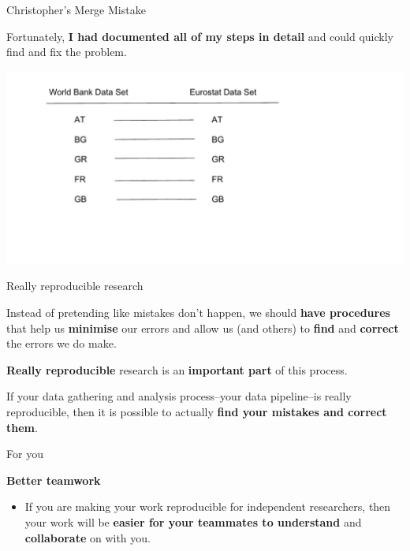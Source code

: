 \documentclass[10pt]{beamer}
\begin{document}
\begin{frame}{Christopher's Merge Mistake}

    Fortunately, \textbf{I had documented all of my steps in detail} and could quickly find and fix the problem.

    \begin{center}
        \includegraphics[scale=0.6]{img/wb_eurostat_match_fix.pdf}
    \end{center}

\end{frame}

\begin{frame}{Really reproducible research}

    Instead of pretending like mistakes don't happen, we should \textbf{have procedures} that help us \textbf{minimise} our errors and allow us (and others) to \textbf{find} and \textbf{correct} the errors we do make.

    \vspace{1cm}

    \textbf{Really reproducible} research is an \textbf{important part} of this process.

\end{frame}

\begin{frame}

    If your data gathering and analysis process--your \alert{data pipeline}--is really reproducible, then it is possible to actually \textbf{find your mistakes and correct them}.

\end{frame}

\begin{frame}{For you}

    \textbf{Better teamwork}

    \begin{itemize}

            \item If you are making your work reproducible for independent researchers, then your work will be \textbf{easier for your teammates to understand} and \textbf{collaborate} on with you.

    \end{itemize}

\end{frame}
\end{document}
